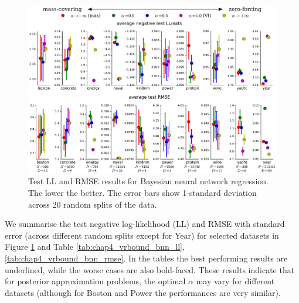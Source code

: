 \begin{figure}[t]
\centering
    \includegraphics[width=1\linewidth]{Chapter4/vrbound/figs/results_all_bnn}
    \caption{Test LL and RMSE results for Bayesian neural network regression. The lower the better. The error bars show 1-standard deviation across 20 random splits of the data.}
    \label{fig:chap4_vrbound_bnn_results_all}
\end{figure}
%
\begin{figure}


       
\end{figure}

We summarise the test negative log-likelihood (LL) and RMSE with standard error (across different random splits except for Year) for selected datasets in Figure \ref{fig:chap4_vrbound_bnn_results_all} and Table \ref{tab:chap4_vrbound_bnn_ll}, \ref{tab:chap4_vrbound_bnn_rmse}. In the tables the best performing results are underlined, while the worse cases are also bold-faced. These results indicate that for posterior approximation problems, the optimal $\alpha$ may vary for different datasets (although for Boston and Power the performances are very similar). 
%

